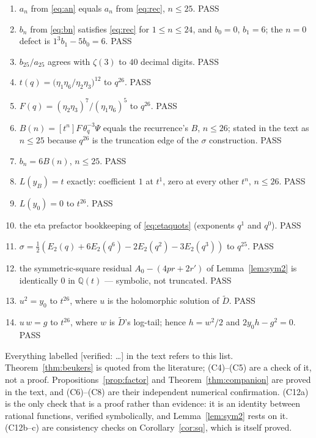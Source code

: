 \documentclass[11pt,reqno]{amsart}
\theoremstyle{plain}
\theoremstyle{definition}
\theoremstyle{remark}
\newcommand{\Q}{\mathbb{Q}}
\newcommand{\tq}{\theta_q}
\numberwithin{equation}{section}
\begin{document}
\begin{enumerate}[label=\textup{(C\arabic*)},leftmargin=3.2em]
\item $a_n$ from \eqref{eq:an} equals $a_n$ from \eqref{eq:rec}, $n\le25$. PASS
\item $b_n$ from \eqref{eq:bn} satisfies \eqref{eq:rec} for $1\le n\le24$, and
      $b_0=0$, $b_1=6$; the $n=0$ defect is $1^3b_1-5b_0=6$. PASS
\item $b_{25}/a_{25}$ agrees with $\zeta(3)$ to $40$ decimal digits. PASS
\item $t(q)=\bigl(\eta_1\eta_6/\eta_2\eta_3\bigr)^{12}$ to $q^{26}$. PASS
\item $F(q)=(\eta_2\eta_3)^7/(\eta_1\eta_6)^5$ to $q^{26}$. PASS
\item $B(n)=[t^n]F\,\tq^{-3}\Psi$ equals the recurrence's $B$, $n\le26$;
      stated in the text as $n\le25$ because $q^{26}$ is the truncation edge of
      the $\sigma$ construction. PASS
\item $b_n=6B(n)$, $n\le25$. PASS
\item $L(y_B)=t$ exactly: coefficient $1$ at $t^1$, zero at every other
      $t^n$, $n\le26$. PASS
\item $L(y_0)=0$ to $t^{26}$. PASS
\item the eta prefactor bookkeeping of \eqref{eq:etaquots} (exponents
      $q^1$ and $q^0$). PASS
\item $\sigma=\tfrac12(E_2(q)+6E_2(q^6)-2E_2(q^2)-3E_2(q^3))$ to $q^{25}$. PASS
\item[\textup{(C12a)}] the symmetric-square residual $A_0-(4pr+2r')$ of
      Lemma~\ref{lem:sym2} is identically $0$ in $\Q(t)$ --- symbolic, not
      truncated. PASS
\item[\textup{(C12b)}] $u^2=y_0$ to $t^{26}$, where $u$ is the holomorphic
      solution of $\widetilde D$. PASS
\item[\textup{(C12c)}] $u\,w=g$ to $t^{26}$, where $w$ is $\widetilde D$'s
      log-tail; hence $h=w^2/2$ and $2y_0h-g^2=0$. PASS
\end{enumerate}

Everything labelled \textup{\textsf{[verified: \dots]}} in the text refers to
this list. Theorem~\ref{thm:beukers} is quoted from the literature; (C4)--(C5)
are a check of it, not a proof. Propositions~\ref{prop:factor} and
Theorem~\ref{thm:companion} are proved in the text, and (C6)--(C8) are their
independent numerical confirmation. (C12a) is the only check that is a proof
rather than evidence: it is an identity between rational functions, verified
symbolically, and Lemma~\ref{lem:sym2} rests on it. (C12b--c) are consistency
checks on Corollary~\ref{cor:sq}, which is itself proved.
\end{document}
